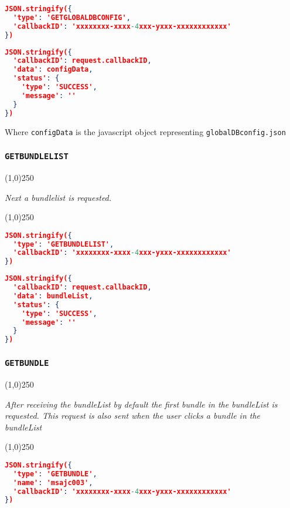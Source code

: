 \documentclass[A4,12pt, utf8]{article}
\begin{document}
\begin{lstlisting}[caption=Request content, language=json]
JSON.stringify({
  'type': 'GETGLOBALDBCONFIG', 
  'callbackID': 'xxxxxxxx-xxxx-4xxx-yxxx-xxxxxxxxxxxx'
})
\end{lstlisting}

\begin{lstlisting}[caption=Reply content, language=json]
JSON.stringify({
  'callbackID': request.callbackID,
  'data': configData,
  'status': {
    'type': 'SUCCESS',
    'message': ''
  }
})
\end{lstlisting}
Where \texttt{configData} is the javascript object representing \texttt{globalDBconfig.json}

\subsubsection{\texttt{GETBUNDLELIST}}
\begin{center}
  \line(1,0){250}

  \textit{Next a bundlelist is requested.}

  \line(1,0){250}
\end{center}


\begin{lstlisting}[caption=Request content, language=json]
JSON.stringify({
  'type': 'GETBUNDLELIST', 
  'callbackID': 'xxxxxxxx-xxxx-4xxx-yxxx-xxxxxxxxxxxx'
})
\end{lstlisting}

\begin{lstlisting}[caption=Reply content, language=json]
JSON.stringify({
  'callbackID': request.callbackID,
  'data': bundleList,
  'status': {
    'type': 'SUCCESS',
    'message': ''
  }
})
\end{lstlisting}

\subsubsection{\texttt{GETBUNDLE}}
\begin{center}
  \line(1,0){250}

  \textit{After receiving the bundleList by default the first bundle in the bundleList is requested. This request is also sent when the user clicks a bundle in the bundleList}

  \line(1,0){250}
\end{center}


\begin{lstlisting}[caption=Request content, language=json]
JSON.stringify({
  'type': 'GETBUNDLE',
  'name': 'msajc003',
  'callbackID': 'xxxxxxxx-xxxx-4xxx-yxxx-xxxxxxxxxxxx'
})
\end{lstlisting}
\end{document}

